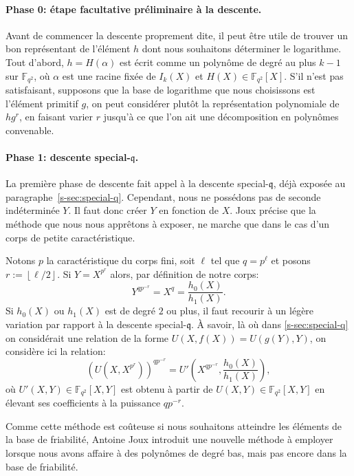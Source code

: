 \documentclass[a4paper, titlepage, 11pt]{article}
\theoremstyle{definition}
\theoremstyle{remark}
\def\gf #1{\mathbb{F}_{#1}}
\def\floor #1{\left\lfloor#1\right\rfloor}
\begin{document}
\paragraph{Phase 0: étape facultative préliminaire à la descente.}Avant de commencer la descente proprement dite, il peut être utile de trouver un bon représentant de l'élément $h$ dont nous souhaitons déterminer le logarithme. Tout d'abord, $h = H(\alpha)$ est écrit comme un polynôme de degré au plus $k-1$ sur $\gf{q^2}$, où $\alpha$ est une racine fixée de $I_k(X)$ et $H(X) \in \gf{q^2}[X]$. S'il n'est pas satisfaisant, supposons que la base de logarithme que nous choisissons est l'élément primitif $g$, on peut considérer plutôt la représentation polynomiale de $hg^r$, en faisant varier $r$ jusqu'à ce que l'on ait une décomposition en polynômes convenable.

\paragraph{Phase 1: descente special-$\mathfrak{q}$.}La première phase de descente fait appel à la descente special-$\mathfrak{q}$, déjà exposée au paragraphe~\ref{s-sec:special-q}. Cependant, nous ne possédons pas de seconde indéterminée $Y$. Il faut donc créer $Y$ en fonction de $X$. Joux \cite{joux2013} précise que la méthode que nous nous apprêtons à exposer, ne marche que dans le cas d'un corps de petite caractéristique.

Notons $p$ la caractéristique du corps fini, soit $\ell$ tel que $q = p^\ell$ et posons $r := \floor{\ell/2}$. Si $Y = X^{p^{r}}$ alors, par définition de notre corps:
$$Y^{qp^{-r}} = X^q = \frac{h_0(X)}{h_1(X)}.$$
Si $h_0(X)$ ou $h_1(X)$ est de degré $2$ ou plus, il faut recourir à un légère variation par rapport à la descente special-$\mathfrak{q}$. À	savoir, là où dans \ref{s-sec:special-q} on considérait une relation de la forme $U(X,f(X)) = U(g(Y),Y)$, on considère ici la relation:
$${\left({U(X,X^{p^r})}\right)}^{qp^{-r}} = U'\left( X^{qp^{-r}},\frac{h_0(X)}{h_1(X)}\right),$$
où $U'(X,Y) \in \gf{q^2}[X,Y]$ est obtenu à partir de $U(X,Y)\in \gf{q^2}[X,Y]$ en élevant ses coefficients à la puissance $qp^{-r}$.

Comme cette méthode est coûteuse si nous souhaitons atteindre les éléments de la base de friabilité, Antoine Joux \cite{joux2013} introduit une nouvelle méthode à employer lorsque nous avons affaire à des polynômes de degré bas, mais pas encore dans la base de friabilité.
\end{document}
